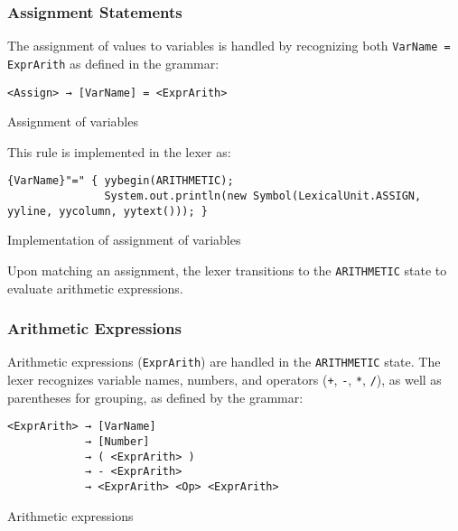 	\subsubsection{Assignment Statements}
	The assignment of values to variables is handled by recognizing both \texttt{VarName = ExprArith} as defined in the grammar:

	\begin{verbatim}
<Assign> → [VarName] = <ExprArith>
	\end{verbatim}

    \begin{table}[h]
		\centering
		\caption{Assignment of variables}
	\end{table}

	This rule is implemented in the lexer as:

	\begin{verbatim}
{VarName}"=" { yybegin(ARITHMETIC);
               System.out.println(new Symbol(LexicalUnit.ASSIGN, yyline, yycolumn, yytext())); }
	\end{verbatim}

    \begin{table}[h]
		\centering
		\caption{Implementation of assignment of variables}
	\end{table}

	Upon matching an assignment, the lexer transitions to the \texttt{ARITHMETIC} state to evaluate arithmetic expressions.

	\subsubsection{Arithmetic Expressions}
	Arithmetic expressions (\texttt{ExprArith}) are handled in the \texttt{ARITHMETIC} state. The lexer recognizes variable names, numbers, and operators (\texttt{+}, \texttt{-}, \texttt{*}, \texttt{/}), as well as parentheses for grouping, as defined by the grammar:

	\begin{verbatim}
<ExprArith> → [VarName]
			→ [Number]
			→ ( <ExprArith> )
			→ - <ExprArith>
			→ <ExprArith> <Op> <ExprArith>
	\end{verbatim}

    \begin{table}[h]
		\centering
		\caption{Arithmetic expressions}
	\end{table}

